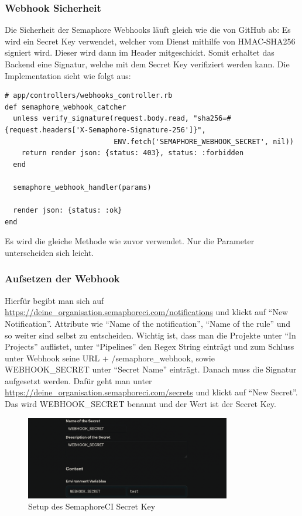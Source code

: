 \subsubsection{Webhook Sicherheit}
Die Sicherheit der Semaphore Webhooks läuft gleich wie die von GitHub ab: Es wird ein Secret Key verwendet,
welcher vom Dienst mithilfe von HMAC-SHA256 signiert wird. Dieser wird dann im Header mitgeschickt. Somit erhaltet
das Backend eine Signatur, welche mit dem Secret Key verifiziert werden kann. \newline
Die Implementation sieht wie folgt aus:
\begin{codebox}[]
  \begin{verbatim}
# app/controllers/webhooks_controller.rb
def semaphore_webhook_catcher
  unless verify_signature(request.body.read, "sha256=#{request.headers['X-Semaphore-Signature-256']}",
                          ENV.fetch('SEMAPHORE_WEBHOOK_SECRET', nil))
    return render json: {status: 403}, status: :forbidden
  end

  semaphore_webhook_handler(params)

  render json: {status: :ok}
end
  \end{verbatim}
\end{codebox}
Es wird die gleiche  Methode wie zuvor verwendet. Nur die Parameter
unterscheiden sich leicht.

\subsubsection{Aufsetzen der Webhook}
Hierfür begibt man sich auf \url{https://deine_organisation.semaphoreci.com/notifications} und klickt auf 
\enquote{New Notification}. Attribute wie \enquote{Name of the notification}, \enquote{Name of the rule} und so weiter
sind selbst zu entscheiden. Wichtig ist, dass man die Projekte unter \enquote{In Projects} auflistet, unter 
\enquote{Pipelines} den Regex String  einträgt und zum Schluss unter Webhook
seine URL + /semaphore\_webhook, sowie WEBHOOK\_SECRET unter \enquote{Secret Name} einträgt.
\newpage
Danach muss die Signatur aufgesetzt werden. Dafür geht man unter
\url{https://deine_organisation.semaphoreci.com/secrets} und klickt auf \enquote{New Secret}. Das wird WEBHOOK\_SECRET
benannt und der Wert ist der Secret Key.
\begin{figure}[H]
  \centering
  \includegraphics[width=0.8\textwidth]{images/misc/setup_semaphore_webhook.png}
  \caption[Screenshot des Setups des SemaphoreCI Secret Key]{Setup des SemaphoreCI Secret Key}
  \label{fig:setup_semaphore_webhook}
\end{figure}

